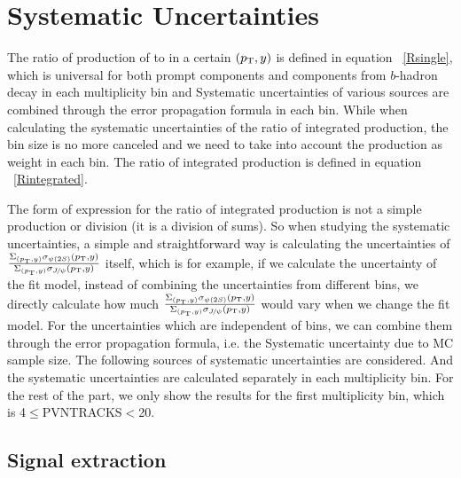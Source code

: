 \section{Systematic Uncertainties}
\def\effTri{\ensuremath{\epsilon_{\mathrm{trigger}}}\xspace}
\def\effTotJ{\ensuremath{\epsilon_{\mathrm{tot,\jpsi}}}\xspace}
\def\effTotP{\ensuremath{\epsilon_{\mathrm{tot,\psitwos}}}\xspace}
\def\pandb{prompt components and components from $b$-hadron decay}
The ratio of production of \psitwos to \jpsi in a certain $(p_{\mathrm{T}},y)$ is 
defined in equation ~\ref{Rsingle}, which is universal for both prompt components and components from $b$-hadron decay in each multiplicity bin and
Systematic uncertainties of various sources are combined through the error propagation formula in each bin.
While when calculating the systematic uncertainties of the ratio of integrated production, the bin size is 
no more canceled and we need to take into account the production as weight in each bin. The ratio of integrated 
production is defined in equation ~\ref{Rintegrated}.

The form of expression for the ratio of integrated production is not a simple production or division (it is a division of sums). So when studying the systematic uncertainties, 
a simple and straightforward way is calculating the uncertainties of $\frac{\Sigma_{(p_{\mathrm{T}},y)}\sigma_{{\psi{(2S)}}}(p_{\mathrm{T}},y)}{\Sigma_{(p_{\mathrm{T}},y)}\sigma_{{{J\mskip -3mu/\mskip -2mu\psi}}}(p_{\mathrm{T}},y)}$ itself, 
which is for example, if we calculate the uncertainty of the fit model, instead of combining the uncertainties from 
different bins, we directly calculate how much $\frac{\Sigma_{(p_{\mathrm{T}},y)}\sigma_{{\psi{(2S)}}}(p_{\mathrm{T}},y)}{\Sigma_{(p_{\mathrm{T}},y)}\sigma_{{{J\mskip -3mu/\mskip -2mu\psi}}}(p_{\mathrm{T}},y)}$ 
would vary when we change the fit model. For the uncertainties which are independent of bins, we can 
combine them through the error propagation formula, i.e. the Systematic uncertainty due to MC sample size.
The following sources of systematic uncertainties are considered. And the systematic uncertainties are calculated 
separately in each multiplicity bin.
For the rest of the part, we only show the results for the first multiplicity bin, which is 4$\leq$PVNTRACKS$<$20. 
\subsection{Signal extraction}
